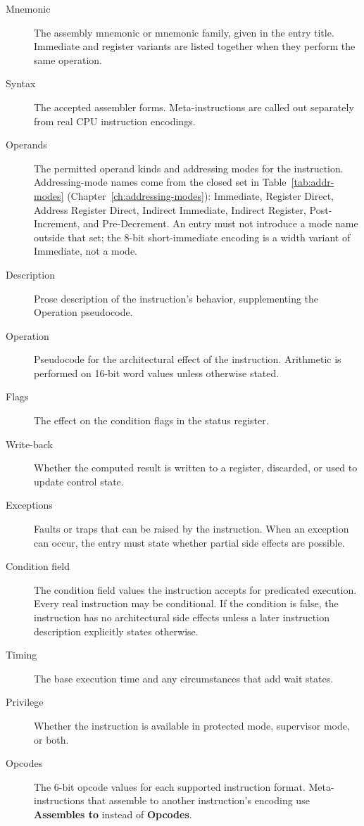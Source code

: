 \begin{description}
	\item[Mnemonic] The assembly mnemonic or mnemonic family, given in the entry title. Immediate and register variants are
	      listed together when they perform the same operation.
	\item[Syntax] The accepted assembler forms. Meta-instructions are called out separately from real CPU instruction encodings.
	\item[Operands] The permitted operand kinds and addressing modes for the instruction. Addressing-mode names come from the
	      closed set in Table~\ref{tab:addr-modes} (Chapter~\ref{ch:addressing-modes}): Immediate, Register Direct, Address
	      Register Direct, Indirect Immediate, Indirect Register, Post-Increment, and Pre-Decrement. An entry must not introduce
	      a mode name outside that set; the 8-bit short-immediate encoding is a width variant of Immediate, not a mode.
	\item[Description] Prose description of the instruction's behavior, supplementing the Operation pseudocode.
	\item[Operation] Pseudocode for the architectural effect of the instruction. Arithmetic is performed on 16-bit word values
	      unless otherwise stated.
	\item[Flags] The effect on the condition flags in the status register.
	\item[Write-back] Whether the computed result is written to a register, discarded, or used to update control state.
	\item[Exceptions] Faults or traps that can be raised by the instruction. When an exception can occur, the entry must state
	      whether partial side effects are possible.
	\item[Condition field] The condition field values the instruction accepts for predicated execution. Every real instruction
	      may be conditional. If the condition is false, the instruction has no architectural side effects unless a later
	      instruction description explicitly states otherwise.
	\item[Timing] The base execution time and any circumstances that add wait states.
	\item[Privilege] Whether the instruction is available in protected mode, supervisor mode, or both.
	\item[Opcodes] The 6-bit opcode values for each supported instruction format. Meta-instructions that assemble to another
	      instruction's encoding use \textbf{Assembles to} instead of \textbf{Opcodes}.

\end{description}
